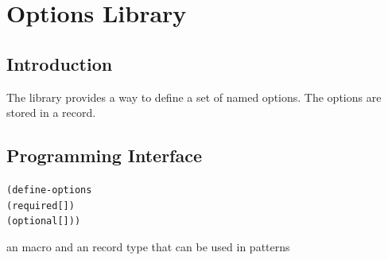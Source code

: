 %
%
%

\chapter {Options Library}\label{chap:options}

\section {Introduction}

The  library provides a way to define a set of named options. The
options are stored in a record.

\section {Programming Interface}

\begin{syntax}\begin{alltt}
(define-options 
  (required [  \etc] \etc)
  (optional [  \etc] \etc))\end{alltt}
\begin{grammar}
\end{grammar}
\end{syntax}
\returns{} an  macro and an  record type that can be
used in  patterns

